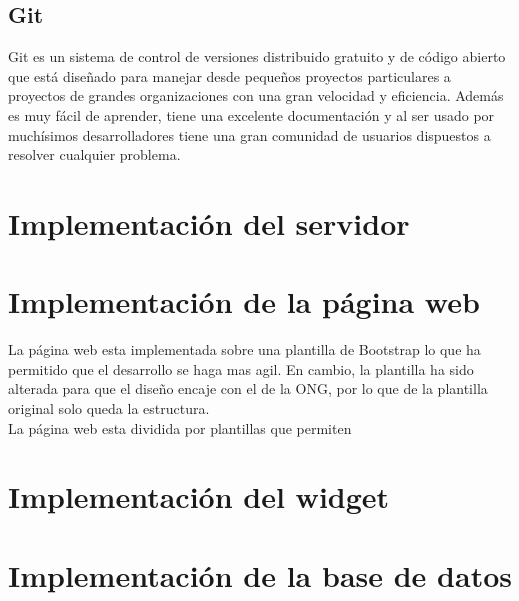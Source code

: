 \subsection{Git}
Git es un sistema de control de versiones distribuido gratuito y de código abierto que está diseñado para manejar desde pequeños proyectos particulares a proyectos de grandes organizaciones con una gran velocidad y eficiencia. Además es muy fácil de aprender, tiene una excelente documentación y al ser usado por muchísimos desarrolladores tiene una gran comunidad de usuarios dispuestos a resolver cualquier problema.

\section{Implementación del servidor}

\section{Implementación de la página web}
La página web esta implementada sobre una plantilla de Bootstrap lo que ha permitido que el desarrollo se haga mas agil. En cambio, la plantilla ha sido alterada para que el diseño encaje con el de la ONG, por lo que de la plantilla original solo queda la estructura. \\

La página web esta dividida por plantillas que permiten 
\section{Implementación del widget}

\section{Implementación de la base de datos}